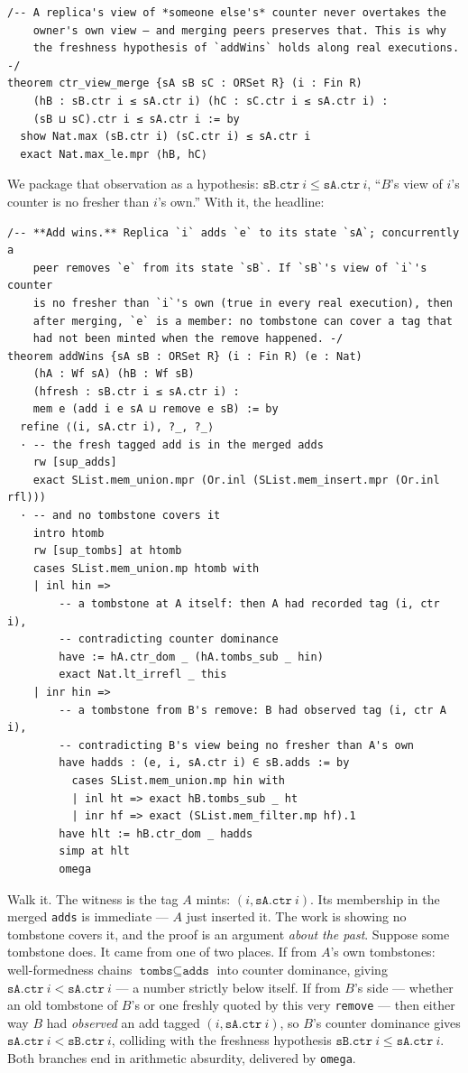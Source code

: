 \documentclass[12pt, a4paper, openright]{book}
\theoremstyle{thmstyle}
\theoremstyle{defstyle}
\newcommand{\lc}[1]{\texttt{#1}}
\newcommand{\lean}[1]{\texttt{#1}}
\begin{document}
\begin{verbatim}
/-- A replica's view of *someone else's* counter never overtakes the
    owner's own view — and merging peers preserves that. This is why
    the freshness hypothesis of `addWins` holds along real executions. -/
theorem ctr_view_merge {sA sB sC : ORSet R} (i : Fin R)
    (hB : sB.ctr i ≤ sA.ctr i) (hC : sC.ctr i ≤ sA.ctr i) :
    (sB ⊔ sC).ctr i ≤ sA.ctr i := by
  show Nat.max (sB.ctr i) (sC.ctr i) ≤ sA.ctr i
  exact Nat.max_le.mpr ⟨hB, hC⟩
\end{verbatim}

We package that observation as a hypothesis:
$\lean{sB.ctr}\ i \le \lean{sA.ctr}\ i$, ``$B$'s view of $i$'s counter is no
fresher than $i$'s own.'' With it, the headline:

\begin{verbatim}
/-- **Add wins.** Replica `i` adds `e` to its state `sA`; concurrently a
    peer removes `e` from its state `sB`. If `sB`'s view of `i`'s counter
    is no fresher than `i`'s own (true in every real execution), then
    after merging, `e` is a member: no tombstone can cover a tag that
    had not been minted when the remove happened. -/
theorem addWins {sA sB : ORSet R} (i : Fin R) (e : Nat)
    (hA : Wf sA) (hB : Wf sB)
    (hfresh : sB.ctr i ≤ sA.ctr i) :
    mem e (add i e sA ⊔ remove e sB) := by
  refine ⟨(i, sA.ctr i), ?_, ?_⟩
  · -- the fresh tagged add is in the merged adds
    rw [sup_adds]
    exact SList.mem_union.mpr (Or.inl (SList.mem_insert.mpr (Or.inl rfl)))
  · -- and no tombstone covers it
    intro htomb
    rw [sup_tombs] at htomb
    cases SList.mem_union.mp htomb with
    | inl hin =>
        -- a tombstone at A itself: then A had recorded tag (i, ctr i),
        -- contradicting counter dominance
        have := hA.ctr_dom _ (hA.tombs_sub _ hin)
        exact Nat.lt_irrefl _ this
    | inr hin =>
        -- a tombstone from B's remove: B had observed tag (i, ctr A i),
        -- contradicting B's view being no fresher than A's own
        have hadds : (e, i, sA.ctr i) ∈ sB.adds := by
          cases SList.mem_union.mp hin with
          | inl ht => exact hB.tombs_sub _ ht
          | inr hf => exact (SList.mem_filter.mp hf).1
        have hlt := hB.ctr_dom _ hadds
        simp at hlt
        omega
\end{verbatim}

Walk it. The witness is the tag $A$ mints: $(i, \lean{sA.ctr}\ i)$. Its
membership in the merged \lc{adds} is immediate --- $A$ just inserted
it. The work is showing no tombstone covers it, and the proof is an
argument \emph{about the past}. Suppose some tombstone does. It came
from one of two places. If from $A$'s own tombstones: well-formedness
chains $\lean{tombs} \subseteq \lean{adds}$ into counter dominance, giving
$\lean{sA.ctr}\ i < \lean{sA.ctr}\ i$ --- a number strictly below itself. If
from $B$'s side --- whether an old tombstone of $B$'s or one freshly
quoted by this very \lc{remove} --- then either way $B$ had
\emph{observed} an add tagged $(i, \lean{sA.ctr}\ i)$, so $B$'s counter
dominance gives $\lean{sA.ctr}\ i < \lean{sB.ctr}\ i$, colliding with the
freshness hypothesis $\lean{sB.ctr}\ i \le \lean{sA.ctr}\ i$. Both branches
end in arithmetic absurdity, delivered by \lc{omega}.
\end{document}
